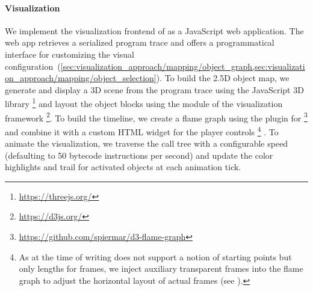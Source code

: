 \paragraph{Visualization}
\label{sec:implementation/visualization}

We implement the visualization frontend of \tfd{} as a JavaScript web application.
The web app retrieves a serialized program trace and offers a programmatical interface for customizing the visual configuration~(\cref{sec:visualization_approach/mapping/object_graph,sec:visualization_approach/mapping/object_selection}).
To build the 2.5D object map, we generate and display a 3D scene from the program trace using the JavaScript 3D library \footnote{\url{https://threejs.org/}} and layout the object blocks using the  module of the visualization framework \footnote{\url{https://d3js.org/}}.
To build the timeline, we create a flame graph using the  plugin for \footnote{\url{https://github.com/spiermar/d3-flame-graph}} and combine it with a custom HTML widget for the player controls%
\footnote{As  at the time of writing does not support a notion of starting points but only lengths for frames, we inject auxiliary transparent frames into the flame graph to adjust the horizontal layout of actual frames (see ).}%
.
To animate the visualization, we traverse the call tree with a configurable speed (defaulting to 50 bytecode instructions per second) and update the color highlights and trail for activated objects at each animation tick.
